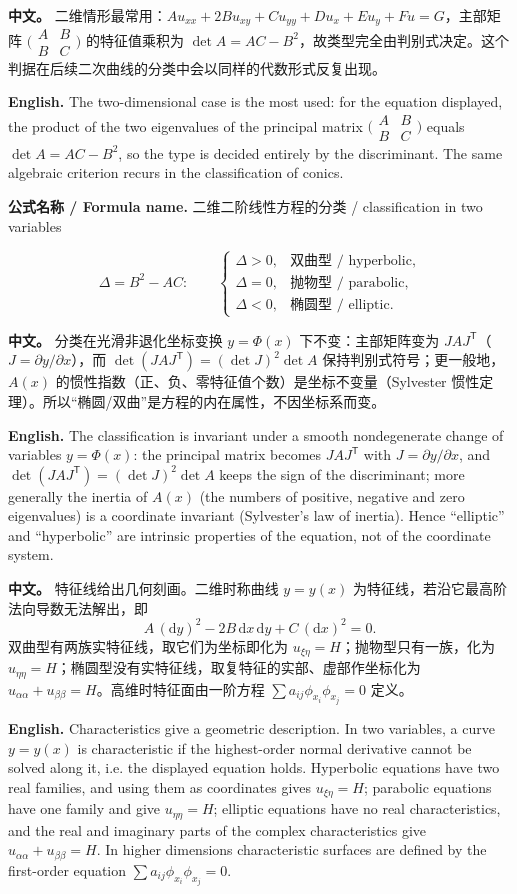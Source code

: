 \documentclass[UTF8,11pt,a4paper]{ctexart}
\newcommand{\APS}[2]{\par\noindent\textbf{中文。} #1\par\noindent\textbf{English.} #2\par\smallskip}
\newcommand{\FORMULA}[2]{\par\noindent\textbf{公式名称 / Formula name.} #1 / #2\par}
\newcommand{\dd}{\mathrm{d}}
\begin{document}
\APS{二维情形最常用：$Au_{xx}+2Bu_{xy}+Cu_{yy}+Du_x+Eu_y+Fu=G$，主部矩阵 $\bigl(\begin{smallmatrix}A&B\\B&C\end{smallmatrix}\bigr)$ 的特征值乘积为 $\det A=AC-B^2$，故类型完全由判别式决定。这个判据在后续二次曲线的分类中会以同样的代数形式反复出现。}{The two-dimensional case is the most used: for the equation displayed, the product of the two eigenvalues of the principal matrix $\bigl(\begin{smallmatrix}A&B\\B&C\end{smallmatrix}\bigr)$ equals $\det A=AC-B^2$, so the type is decided entirely by the discriminant. The same algebraic criterion recurs in the classification of conics.}

\FORMULA{二维二阶线性方程的分类}{classification in two variables}
\[
\Delta=B^2-AC:\qquad
\begin{cases}
\Delta>0, & \text{双曲型 / hyperbolic},\\
\Delta=0, & \text{抛物型 / parabolic},\\
\Delta<0, & \text{椭圆型 / elliptic}.
\end{cases}
\]

\APS{分类在光滑非退化坐标变换 $y=\Phi(x)$ 下不变：主部矩阵变为 $J A J^{\mathsf T}$（$J=\partial y/\partial x$），而 $\det(JAJ^{\mathsf T})=(\det J)^2\det A$ 保持判别式符号；更一般地，$A(x)$ 的惯性指数（正、负、零特征值个数）是坐标不变量（Sylvester 惯性定理）。所以``椭圆/双曲''是方程的内在属性，不因坐标系而变。}{The classification is invariant under a smooth nondegenerate change of variables $y=\Phi(x)$: the principal matrix becomes $JAJ^{\mathsf T}$ with $J=\partial y/\partial x$, and $\det(JAJ^{\mathsf T})=(\det J)^2\det A$ keeps the sign of the discriminant; more generally the inertia of $A(x)$ (the numbers of positive, negative and zero eigenvalues) is a coordinate invariant (Sylvester's law of inertia). Hence ``elliptic'' and ``hyperbolic'' are intrinsic properties of the equation, not of the coordinate system.}

\APS{特征线给出几何刻画。二维时称曲线 $y=y(x)$ 为特征线，若沿它最高阶法向导数无法解出，即
\[
A\,(\dd y)^2-2B\,\dd x\,\dd y+C\,(\dd x)^2=0 .
\]
双曲型有两族实特征线，取它们为坐标即化为 $u_{\xi\eta}=H$；抛物型只有一族，化为 $u_{\eta\eta}=H$；椭圆型没有实特征线，取复特征的实部、虚部作坐标化为 $u_{\alpha\alpha}+u_{\beta\beta}=H$。高维时特征面由一阶方程 $\sum a_{ij}\phi_{x_i}\phi_{x_j}=0$ 定义。}{Characteristics give a geometric description. In two variables, a curve $y=y(x)$ is characteristic if the highest-order normal derivative cannot be solved along it, i.e. the displayed equation holds. Hyperbolic equations have two real families, and using them as coordinates gives $u_{\xi\eta}=H$; parabolic equations have one family and give $u_{\eta\eta}=H$; elliptic equations have no real characteristics, and the real and imaginary parts of the complex characteristics give $u_{\alpha\alpha}+u_{\beta\beta}=H$. In higher dimensions characteristic surfaces are defined by the first-order equation $\sum a_{ij}\phi_{x_i}\phi_{x_j}=0$.}
\end{document}
